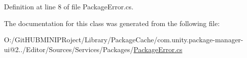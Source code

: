 Definition at line 8 of file Package\+Error.\+cs.



The documentation for this class was generated from the following file\+:\begin{DoxyCompactItemize}
\item 
O\+:/\+Git\+H\+U\+B\+M\+I\+N\+I\+P\+Roject/\+Library/\+Package\+Cache/com.\+unity.\+package-\/manager-\/ui@2../\+Editor/\+Sources/\+Services/\+Packages/\mbox{\hyperlink{_package_error_8cs}{Package\+Error.\+cs}}\end{DoxyCompactItemize}
